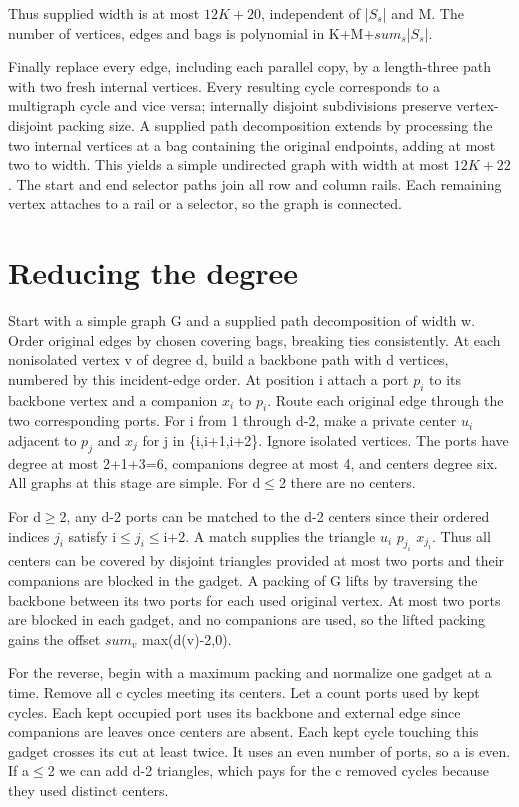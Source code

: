 \documentclass[11pt]{article}
\begin{document}
Thus supplied width is at most $12K+20$, independent of |$S_s$| and M. The number of vertices, edges and bags is polynomial in K+M+$sum_s$|$S_s$|.

Finally replace every edge, including each parallel copy, by a length-three path with two fresh internal vertices. Every resulting cycle corresponds to a multigraph cycle and vice versa; internally disjoint subdivisions preserve vertex-disjoint packing size. A supplied path decomposition extends by processing the two internal vertices at a bag containing the original endpoints, adding at most two to width. This yields a simple undirected graph with width at most $12K+22$. The start and end selector paths join all row and column rails. Each remaining vertex attaches to a rail or a selector, so the graph is connected.


\section{Reducing the degree}




Start with a simple graph G and a supplied path decomposition of width w. Order original edges by chosen covering bags, breaking ties consistently. At each nonisolated vertex v of degree d, build a backbone path with d vertices, numbered by this incident-edge order. At position i attach a port $p_i$ to its backbone vertex and a companion $x_i$ to $p_i$. Route each original edge through the two corresponding ports. For i from 1 through d-2, make a private center $u_i$ adjacent to $p_j$ and $x_j$ for j in \{i,i+1,i+2\}. Ignore isolated vertices. The ports have degree at most 2+1+3=6, companions degree at most 4, and centers degree six. All graphs at this stage are simple. For d\(\le\)2 there are no centers.

For d\(\ge\)2, any d-2 ports can be matched to the d-2 centers since their ordered indices $j_i$ satisfy i\(\le\)$j_i$\(\le\)i+2. A match supplies the triangle $u_i$ $p_{j_i}$ $x_{j_i}$. Thus all centers can be covered by disjoint triangles provided at most two ports and their companions are blocked in the gadget. A packing of G lifts by traversing the backbone between its two ports for each used original vertex. At most two ports are blocked in each gadget, and no companions are used, so the lifted packing gains the offset $sum_v$ max(d(v)-2,0).

For the reverse, begin with a maximum packing and normalize one gadget at a time. Remove all c cycles meeting its centers. Let a count ports used by kept cycles. Each kept occupied port uses its backbone and external edge since companions are leaves once centers are absent. Each kept cycle touching this gadget crosses its cut at least twice. It uses an even number of ports, so a is even. If a\(\le\)2 we can add d-2 triangles, which pays for the c removed cycles because they used distinct centers.
\end{document}
